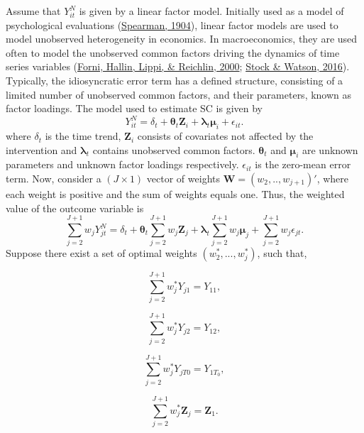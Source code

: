\documentclass[12pt,nobind, a4paper]{reedthesis}
\begin{document}
 Assume that \(Y^{N}_{it}\) is given by a linear factor model. Initially used as a model of psychological evaluations (\protect\hyperlink{ref-spearman_general_1904}{Spearman, 1904}), linear factor models are used to model unobserved heterogeneity in economics. In macroeconomics, they are used often to model the unobserved common factors driving the dynamics of time series variables (\protect\hyperlink{ref-forni_generalized_2000}{Forni, Hallin, Lippi, \& Reichlin, 2000}; \protect\hyperlink{ref-stock_dynamic_2016}{Stock \& Watson, 2016}). Typically, the idiosyncratic error term has a defined structure, consisting of a limited number of unobserved common factors, and their parameters, known as factor loadings. The model used to estimate SC is given by
 \begin{equation}
 Y^{N}_{it}= \delta_{t}+\boldsymbol{\theta}_{t}\mathbf{Z}_{i}+\boldsymbol{\lambda}_{t} \boldsymbol{\mu}_{i}+ \epsilon_{it}.
 \label{eq:eq4}
 \end{equation}
 where \(\delta_{t}\) is the time trend, \(\mathbf{Z}_{i}\) consists of covariates not affected by the intervention and \(\boldsymbol{\lambda}_{t}\) contains unobserved common factors. \(\boldsymbol{\theta}_{t}\) and \(\boldsymbol{\mu}_{i}\) are unknown parameters and unknown factor loadings respectively. \(\epsilon_{it}\) is the zero-mean error term. Now, consider a \((J\times 1)\) vector of weights \(\mathbf{W}=(w_{2},..,w_{j+1})'\), where each weight is positive and the sum of weights equals one. Thus, the weighted value of the outcome variable is
 \begin{equation}
 \sum_{j=2}^{J+1}w_{j}Y^{N}_{jt}= \delta_{t}+\boldsymbol{\theta}_{t}\sum_{j=2}^{J+1}w_{j}\mathbf{Z}_{j}+\boldsymbol{\lambda}_{t}\sum_{j=2}^{J+1}w_{j}\boldsymbol{\mu}_{j}+\sum_{j=2}^{J+1}w_{j}\epsilon_{jt}.
 \label{eq:eq5}
 \end{equation}
 Suppose there exist a set of optimal weights \((w_{2}^{*},...,w_{j}^{*})\), such that,

 \[\sum_{j=2}^{J+1}w_{j}^{*}Y_{j1}=Y_{11},\]

 \[ \sum_{j=2}^{J+1}w_{j}^{*}Y_{j2}=Y_{12},\]

 \[\sum_{j=2}^{J+1}w_{j}^{*}Y_{jT0}=Y_{1T_0},\]

 \[\sum_{j=2}^{J+1}w_{j}^{*} \mathbf{Z}_{j}=\mathbf{Z}_{1}.\]
\end{document}

